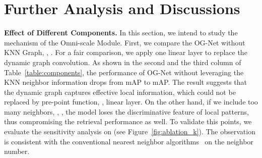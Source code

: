 \setlength{\tabcolsep}{4pt}
\begin{table}[t]{
\caption{Classification results on ModelNet~\cite{wu20153d}. We do not focus on the point cloud classification problem, but show the feasibility of the proposed OG-Net. : We provide results based on our re-implementation, which is slightly higher than the reported result in \cite{qi2017pointnet++}. } \label{table:model}
{
}}
\end{table}

\section{Further Analysis and Discussions}


\textbf{Effect of Different Components.} In this section, we intend to study the mechanism of the Omni-scale Module. First, we compare the OG-Net without KNN Graph, \ie, . For a fair comparison, we apply one linear layer to replace the dynamic graph convolution. 
As shown in the second and the third column of Table~\ref{table:components}, the performance of OG-Net without leveraging the KNN neighbor information drops from  mAP to  mAP. The result suggests that the dynamic graph captures effective local information, which could not be replaced by pre-point function, \eg, linear layer. On the other hand, if we include too many neighbors, \eg, , the model loses the discriminative feature of local patterns, thus compromising the retrieval performance as well. To validate this points, we evaluate the sensitivity analysis on  (see Figure~\ref{fig:ablation_k}). The observation is consistent with the conventional  nearest neighbor algorithms~\cite{peterson2009k} on the neighbor number.

